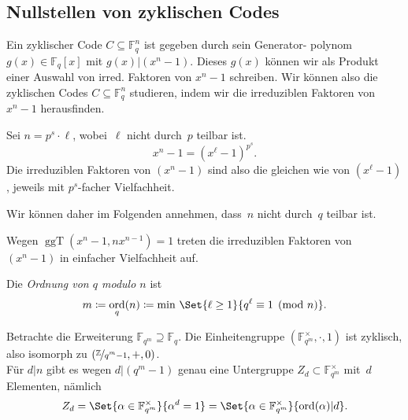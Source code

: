 \documentclass{cheat-sheet}
\newcommand{\F}{\mathbb{F}} %
\newcommand{\divides}{|} %
\DeclareMathOperator{\ggT}{ggT} %
\DeclareMathOperator{\ord}{ord} %
\begin{document}

\subsection{Nullstellen von zyklischen Codes}

\begin{ziel}
  Ein zyklischer Code $C \subseteq \F_q^n$ ist gegeben durch sein Generator- polynom $g(x) \in \F_q[x]$ mit $g(x) \divides (x^n - 1)$.
  Dieses $g(x)$ können wir als Produkt einer Auswahl von irred. Faktoren von $x^n - 1$ schreiben.
  Wir können also die zyklischen Codes $C \subseteq \F_q^n$ studieren, indem wir die irreduziblen Faktoren von $x^n - 1$ herausfinden.
\end{ziel}

\begin{bem}
  Sei $n = p^s \cdot \ell$, wobei~$\ell$ nicht durch~$p$ teilbar ist.
  \[
    x^n - 1 = (x^\ell - 1)^{p^s}.
  \]
  Die irreduziblen Faktoren von $(x^n - 1)$ sind also die gleichen wie von $(x^\ell - 1)$, jeweils mit $p^s$-facher Vielfachheit.
\end{bem}

\begin{voraussetzung}
  Wir können daher im Folgenden annehmen, dass~$n$ nicht durch~$q$ teilbar ist.
\end{voraussetzung}

\begin{bem}
  Wegen $\ggT(x^n - 1, n x^{n - 1}) = 1$ treten die irreduziblen Faktoren von $(x^n - 1)$ in einfacher Vielfachheit auf.
\end{bem}

\begin{defn}
  Die \emph{Ordnung von $q$ modulo $n$} ist
  \[
    m \coloneqq \ord_q(n) \coloneqq \min \, \Set{\ell \geq 1}{q^\ell \equiv 1 \pmod{n}}.
  \]
\end{defn}

\begin{bem}
  Betrachte die Erweiterung $\F_{q^m} \supseteq \F_q$.
  Die Einheitengruppe $(\F_{q^m}^{\times}, \cdot, 1)$ ist zyklisch, also isomorph zu $(\nicefrac{\mathbb{Z}}{q^m - 1}, +, 0)$. \\
  Für $d \divides n$ gibt es wegen $d \divides (q^m - 1)$ genau eine Untergruppe $Z_d \subset \F_{q^m}^{\times}$ mit~$d$ Elementen, nämlich
  \[
    Z_d = \Set{\alpha \in \F_{q^m}^{\times}}{\alpha^d = 1} = \Set{\alpha \in \F_{q^m}^{\times}}{\ord(\alpha) \divides d}.
  \]
\end{bem}
  
\end{document}
